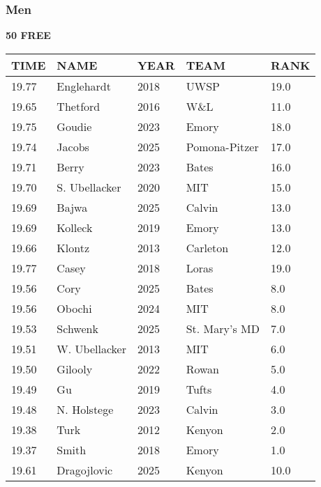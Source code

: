 \subsubsection{Men}

\begin{table}[H]
\centering
\begin{minipage}[t]{0.48\textwidth}
\centering
\textbf{50 FREE}\\[0.1cm]
\begin{tabular}{@{}p{1.8cm}p{2.8cm}p{1.2cm}p{1.4cm}p{0.8cm}@{}}
\hline
    \textbf{TIME} & \textbf{NAME} & \textbf{YEAR} & \textbf{TEAM} & \textbf{RANK} \\
\hline
    19.77 & Englehardt & 2018 & UWSP & 19.0 \\
    19.65 & Thetford & 2016 & W\&L & 11.0 \\
    19.75 & Goudie & 2023 & Emory & 18.0 \\
    19.74 & Jacobs & 2025 & Pomona-Pitzer & 17.0 \\
    19.71 & Berry & 2023 & Bates & 16.0 \\
    19.70 & S. Ubellacker & 2020 & MIT & 15.0 \\
    19.69 & Bajwa & 2025 & Calvin & 13.0 \\
    19.69 & Kolleck & 2019 & Emory & 13.0 \\
    19.66 & Klontz & 2013 & Carleton & 12.0 \\
    19.77 & Casey & 2018 & Loras & 19.0 \\
    19.56 & Cory & 2025 & Bates & 8.0 \\
    19.56 & Obochi & 2024 & MIT & 8.0 \\
    19.53 & Schwenk & 2025 & St. Mary's MD & 7.0 \\
    19.51 & W. Ubellacker & 2013 & MIT & 6.0 \\
    19.50 & Gilooly & 2022 & Rowan & 5.0 \\
    19.49 & Gu & 2019 & Tufts & 4.0 \\
    19.48 & N. Holstege & 2023 & Calvin & 3.0 \\
    19.38 & Turk & 2012 & Kenyon & 2.0 \\
    19.37 & Smith & 2018 & Emory & 1.0 \\
    19.61 & Dragojlovic & 2025 & Kenyon & 10.0 \\
\hline
\end{tabular}
\end{minipage}\hfill
\begin{minipage}[t]{0.48\textwidth}

\end{minipage}
\end{table}
